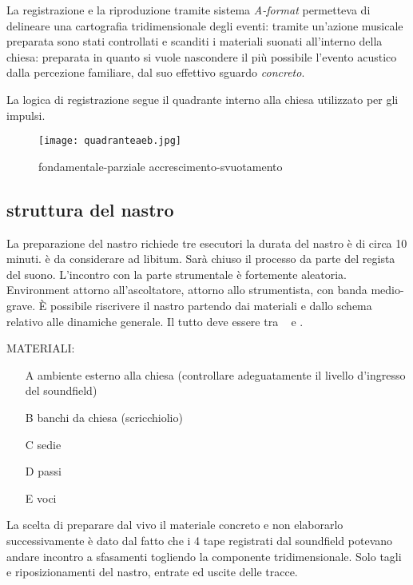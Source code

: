 La registrazione e la riproduzione tramite sistema \emph{A-format} permetteva di delineare una
cartografia tridimensionale degli eventi: tramite un'azione musicale preparata sono stati
controllati e scanditi i materiali suonati all'interno della chiesa: preparata in quanto
si vuole nascondere il più possibile l’evento acustico dalla percezione familiare, dal
suo effettivo sguardo \emph{concreto}.

La logica di registrazione segue il quadrante interno alla chiesa utilizzato per gli impulsi.



\begin{figure}[h]
\centering
{\texttt{[image: quadranteaeb.jpg]}}
\caption[Passaggio microtonale]{fondamentale-parziale accrescimento-svuotamento}
\label{fig:microtoni}
\end{figure}

\subsection{struttura del nastro}

La preparazione del nastro richiede tre esecutori                                                            
la durata del nastro è di circa 10 minuti.
è da considerare ad libitum. Sarà chiuso il processo da parte del regista del suono.
L'incontro con la parte strumentale è fortemente aleatoria. Environment attorno all’ascoltatore,
attorno allo strumentista, con banda medio-grave. È possibile riscrivere il nastro
partendo dai materiali e dallo schema relativo alle dinamiche generale. Il tutto deve
essere tra \ppp\ppp ~ e \pp .

\bigskip

MATERIALI:

\begin{enumerate}
	\item [A] ambiente esterno alla chiesa \newline (controllare adeguatamente il livello d'ingresso del soundfield)
	\item [B] banchi da chiesa (scricchiolio)
	\item [C] sedie
	\item [D] passi
	\item [E] voci
\end{enumerate}

La scelta di preparare  dal vivo il materiale  concreto e non elaborarlo successivamente
è dato dal fatto che i 4 tape registrati dal soundfield potevano andare incontro a
sfasamenti togliendo la componente tridimensionale. Solo tagli e riposizionamenti
del nastro, entrate ed uscite delle tracce.

